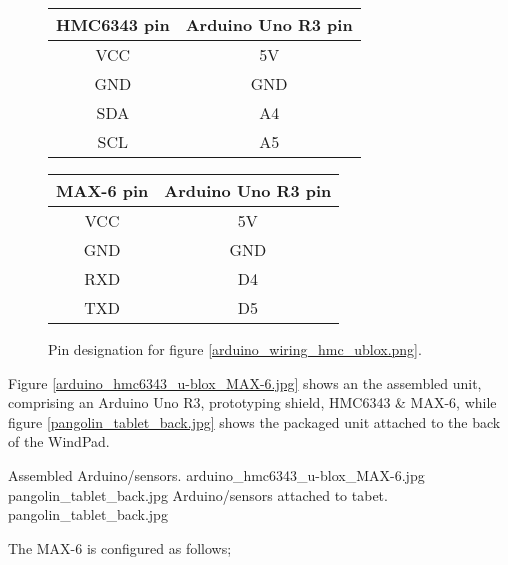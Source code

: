 \begin{figure}[h]
\begin{center}
\begin{minipage}[t]{.47\linewidth}
\begin{center}
\begin{tabular}{| c | c |}
\hline	
\textbf{HMC6343 pin} & \textbf{Arduino Uno R3 pin} \\
\hline
VCC & 5V\HMCvccFootnote{} \\
\hline
GND & GND \\
\hline
SDA & A4\itwocFootnote{} \\
\hline
SCL & A5 \\
\hline
\end{tabular}
\end{center}
\end{minipage}
%
\begin{minipage}[t]{.47\linewidth}
\begin{center}
\begin{tabular}{| c | c |}
\hline	
\textbf{MAX-6 pin} & \textbf{Arduino Uno R3 pin} \\
\hline
VCC & 5V\MAXvccFootnote{} \\
\hline
GND & GND \\
\hline
RXD & D4 \MAXserialFootnote{}\\
\hline
TXD & D5 \\
\hline
\end{tabular}
\end{center}
\end{minipage}
\caption{Pin designation for figure \ref{arduino_wiring_hmc_ublox.png}.}
\label{HMC6343_MAX6_wiringtable}
\end{center}
\end{figure}

Figure \ref{arduino_hmc6343_u-blox_MAX-6.jpg} shows an the assembled unit, comprising an Arduino Uno R3, prototyping shield, HMC6343 \& MAX-6, while figure \ref{pangolin_tablet_back.jpg} shows the packaged unit attached to the back of the WindPad.

 {Assembled Arduino/sensors.} {arduino_hmc6343_u-blox_MAX-6.jpg}
       {pangolin_tablet_back.jpg} {Arduino/sensors attached to tabet.} {pangolin_tablet_back.jpg}
       

The MAX-6 is configured as follows;

